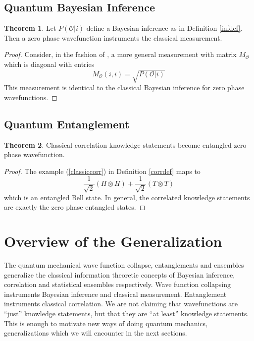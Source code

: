\documentclass[12pt,a4paper]{article}
\theoremstyle{myrule}
\theoremstyle{postulate}
\theoremstyle{definition}
\newtheorem{theorem}{Theorem}[section]
\begin{document}
\subsection{Quantum Bayesian Inference}
\begin{theorem}
  Let $P(\mathcal{O} | i)$ define a Bayesian inference as in Definition \ref{infdef}.  Then a zero phase wavefunction instruments the classical measurement.
\end{theorem}
\begin{proof}
Consider, in the fashion of \cite{nielsenchuang}, a more general measurement with matrix $M_\mathcal{O}$ which is diagonal with entries
\[
   M_\mathcal{O}(i,i) = \sqrt{P(\mathcal{O} | i)}
\]
This measurement is identical to the classical Bayesian inference for zero phase wavefunctions.
\end{proof}

\subsection{Quantum Entanglement}
\label{entangle}
\begin{theorem}
  Classical correlation knowledge statements become entangled zero phase wavefunction.
\end{theorem}
\begin{proof}
  The example (\ref{classiccorr}) in Definition \ref{corrdef} maps to
 \begin{equation}
  \label{bell}
  \frac{1}{\sqrt{2}} (H \otimes H) + \frac{1}{\sqrt{2}} (T \otimes T)
\end{equation}
which is an entangled Bell state.  In general, the correlated knowledge statements are exactly the zero phase entangled states.
\end{proof}

\section{Overview of the Generalization}

The quantum mechanical wave function collapse, entanglements and ensembles generalize the classical information theoretic concepts of Bayesian inference, correlation and statistical ensembles respectively.  Wave function collapsing instruments Bayesian inference and classical measurement.  Entanglement instruments classical correlation.  We are not claiming that wavefunctions are ``just'' knowledge statements, but that they are ``at least'' knowledge statements.  This is enough to motivate new ways of doing quantum mechanics, generalizations which we will encounter in the next sections.
\end{document}
